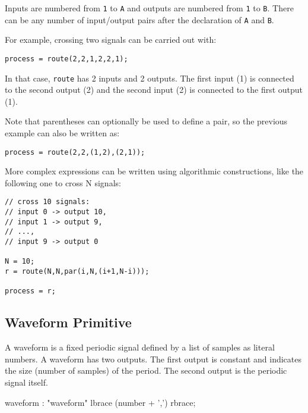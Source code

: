 Inputs are numbered from \lstinline'1' to \lstinline'A' and outputs are numbered from \lstinline'1' to \lstinline'B'. There can be any number of input/output pairs after the declaration of \lstinline'A' and \lstinline'B'.

For example, crossing two signals can be carried out with:

\begin{lstlisting}
process = route(2,2,1,2,2,1);
\end{lstlisting}

In that case, \lstinline'route' has 2 inputs and 2 outputs. The first input (1) is connected to the second output (2) and the second input (2) is connected to the first output (1).

Note that parentheses can optionally be used to define a pair, so the previous example can also be written as:

\begin{lstlisting}
process = route(2,2,(1,2),(2,1));
\end{lstlisting}

More complex expressions can be written using algorithmic constructions, like the following one to cross N signals:

\begin{lstlisting}
// cross 10 signals: 
// input 0 -> output 10, 
// input 1 -> output 9, 
// ..., 
// input 9 -> output 0

N = 10;
r = route(N,N,par(i,N,(i+1,N-i)));

process = r;
\end{lstlisting}

\subsection{Waveform Primitive}

A waveform is a fixed periodic signal defined by a list of samples as literal numbers. A waveform has two outputs. The first output is constant and indicates the size (number of samples) of the period. The second output is the periodic signal itself.

\begin{rail}
	waveform : "waveform" lbrace (number + ',') rbrace;
\end{rail}

